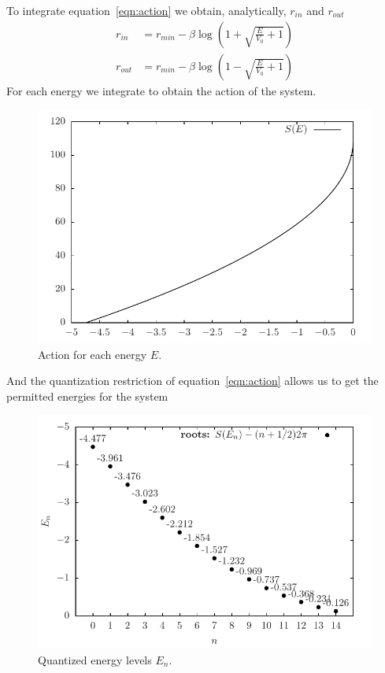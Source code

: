 \documentclass[11pt]{article}
\begin{document}
To integrate equation~\ref{eqn:action} we obtain, analytically, $r_{in}$ and $r_{out}$
\begin{align*}
  r_{in} &= r_{min} -\beta\log\left(1+\sqrt{\frac{E}{V_0}+1}\right)\\
  r_{out}&= r_{min} -\beta\log\left(1-\sqrt{\frac{E}{V_0}+1}\right)
\end{align*}
For each energy we integrate to obtain the action of the system.
\begin{figure}[H]
  \centering
  \includegraphics[width=\linewidth]{action-Morse}
  \caption{Action for each energy $E$.}
\label{fig:action-Morse}
\end{figure}
And the quantization restriction of equation~\ref{eqn:action} allows us to get the permitted energies for the system
\begin{figure}[H]
  \centering
  \includegraphics[width=\linewidth]{quantizedEnergy-Morse}
  \caption{Quantized energy levels $E_n$.}
\label{fig:energy-Morse}
\end{figure}
\end{document}
